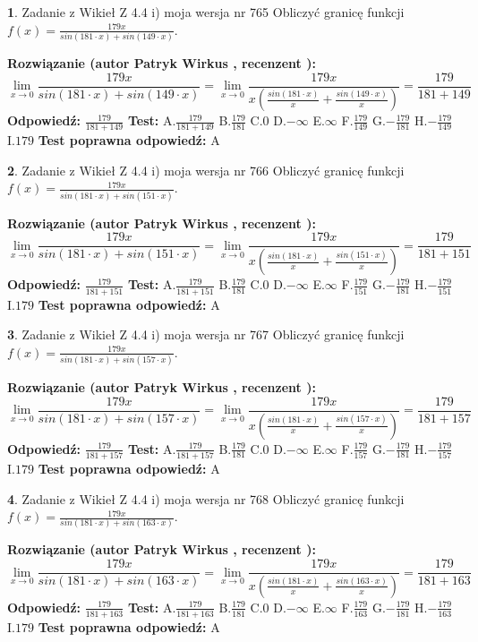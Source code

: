 \documentclass[12pt, a4paper]{article}
\theoremstyle{definition} %
\newtheorem{zad}{}
\newcommand{\zadStart}[1]{\begin{zad}#1\newline}
\newcommand{\zadStop}{\end{zad}}
\newcommand{\rozwStart}[2]{\noindent \textbf{Rozwiązanie (autor #1 , recenzent #2): }\newline}
\newcommand{\rozwStop}{\newline}
\newcommand{\odpStart}{\noindent \textbf{Odpowiedź:}\newline}
\newcommand{\odpStop}{\newline}
\newcommand{\testStart}{\noindent \textbf{Test:}\newline}
\newcommand{\testStop}{\newline}
\newcommand{\kluczStart}{\noindent \textbf{Test poprawna odpowiedź:}\newline}
\newcommand{\kluczStop}{\newline}
\begin{document}
\zadStart{Zadanie z Wikieł Z 4.4 i) moja wersja nr 765}
Obliczyć granicę funkcji $f(x)=\frac{179x}{sin(181\cdot x) +sin(149\cdot x)}$.
\zadStop
\rozwStart{Patryk Wirkus}{}
$$\lim\limits_{x\to 0}\frac{179x}{sin(181\cdot x) +sin(149\cdot x)}=\lim\limits_{x\to 0}\frac{179x}{x(\frac{sin(181\cdot x)}{x}+\frac{sin(149\cdot x)}{x})}=\frac{179}{181+149}$$
\rozwStop
\odpStart
$\frac{179}{181+149}$
\odpStop
\testStart
A.$\frac{179}{181+149}$
B.$\frac{179}{181}$
C.$0$
D.$-\infty$
E.$\infty$
F.$\frac{179}{149}$
G.$-\frac{179}{181}$
H.$-\frac{179}{149}$
I.$179$
\testStop
\kluczStart
A
\kluczStop



\zadStart{Zadanie z Wikieł Z 4.4 i) moja wersja nr 766}
Obliczyć granicę funkcji $f(x)=\frac{179x}{sin(181\cdot x) +sin(151\cdot x)}$.
\zadStop
\rozwStart{Patryk Wirkus}{}
$$\lim\limits_{x\to 0}\frac{179x}{sin(181\cdot x) +sin(151\cdot x)}=\lim\limits_{x\to 0}\frac{179x}{x(\frac{sin(181\cdot x)}{x}+\frac{sin(151\cdot x)}{x})}=\frac{179}{181+151}$$
\rozwStop
\odpStart
$\frac{179}{181+151}$
\odpStop
\testStart
A.$\frac{179}{181+151}$
B.$\frac{179}{181}$
C.$0$
D.$-\infty$
E.$\infty$
F.$\frac{179}{151}$
G.$-\frac{179}{181}$
H.$-\frac{179}{151}$
I.$179$
\testStop
\kluczStart
A
\kluczStop



\zadStart{Zadanie z Wikieł Z 4.4 i) moja wersja nr 767}
Obliczyć granicę funkcji $f(x)=\frac{179x}{sin(181\cdot x) +sin(157\cdot x)}$.
\zadStop
\rozwStart{Patryk Wirkus}{}
$$\lim\limits_{x\to 0}\frac{179x}{sin(181\cdot x) +sin(157\cdot x)}=\lim\limits_{x\to 0}\frac{179x}{x(\frac{sin(181\cdot x)}{x}+\frac{sin(157\cdot x)}{x})}=\frac{179}{181+157}$$
\rozwStop
\odpStart
$\frac{179}{181+157}$
\odpStop
\testStart
A.$\frac{179}{181+157}$
B.$\frac{179}{181}$
C.$0$
D.$-\infty$
E.$\infty$
F.$\frac{179}{157}$
G.$-\frac{179}{181}$
H.$-\frac{179}{157}$
I.$179$
\testStop
\kluczStart
A
\kluczStop



\zadStart{Zadanie z Wikieł Z 4.4 i) moja wersja nr 768}
Obliczyć granicę funkcji $f(x)=\frac{179x}{sin(181\cdot x) +sin(163\cdot x)}$.
\zadStop
\rozwStart{Patryk Wirkus}{}
$$\lim\limits_{x\to 0}\frac{179x}{sin(181\cdot x) +sin(163\cdot x)}=\lim\limits_{x\to 0}\frac{179x}{x(\frac{sin(181\cdot x)}{x}+\frac{sin(163\cdot x)}{x})}=\frac{179}{181+163}$$
\rozwStop
\odpStart
$\frac{179}{181+163}$
\odpStop
\testStart
A.$\frac{179}{181+163}$
B.$\frac{179}{181}$
C.$0$
D.$-\infty$
E.$\infty$
F.$\frac{179}{163}$
G.$-\frac{179}{181}$
H.$-\frac{179}{163}$
I.$179$
\testStop
\kluczStart
A
\kluczStop
\end{document}
